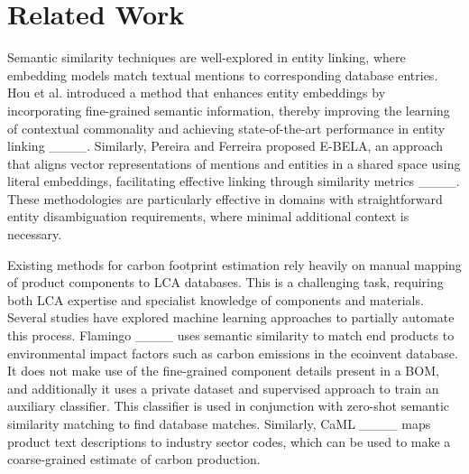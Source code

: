 \section{Related Work}
Semantic similarity techniques are well-explored in entity linking, where embedding models match textual mentions to corresponding database entries. Hou et al. introduced a method that enhances entity embeddings by incorporating fine-grained semantic information, thereby improving the learning of contextual commonality and achieving state-of-the-art performance in entity linking ____. Similarly, Pereira and Ferreira proposed E-BELA, an approach that aligns vector representations of mentions and entities in a shared space using literal embeddings, facilitating effective linking through similarity metrics ____. These methodologies are particularly effective in domains with straightforward entity disambiguation requirements, where minimal additional context is necessary. 

Existing methods for carbon footprint estimation rely heavily on manual mapping of product components to LCA databases. This is a challenging task, requiring both LCA expertise and specialist knowledge of components and materials. Several studies have explored machine learning approaches to partially automate this process. Flamingo ____ uses semantic similarity to match end products to environmental impact factors such as carbon emissions in the ecoinvent database. It does not make use of the fine-grained component details present in a BOM, and additionally it uses a private dataset and supervised approach to train an auxiliary classifier. This classifier is used in conjunction with zero-shot semantic similarity matching to find database matches. Similarly, CaML ____ maps product text descriptions to industry sector codes, which can be used to make a coarse-grained estimate of carbon production.
